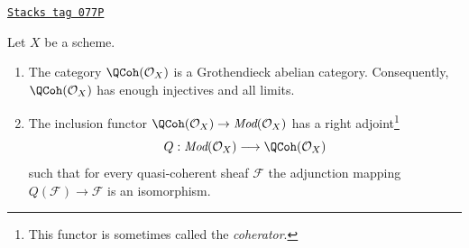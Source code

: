\begin{proposition}[Coherator]
\label{properties-proposition-coherator}
\href{https://stacks.math.columbia.edu/tag/077P}{\texttt{Stacks tag 077P}}

Let $X$ be a scheme.
\begin{enumerate}
\item The category $\QCoh(\mathcal{O}_X)$ is a Grothendieck
abelian category. Consequently, $\QCoh(\mathcal{O}_X)$
has enough injectives and all limits.
\item The inclusion functor
$\QCoh(\mathcal{O}_X) \to \textit{Mod}(\mathcal{O}_X)$
has a right adjoint\footnote{This functor is sometimes called
the {\it coherator}.}
$$
Q : \textit{Mod}(\mathcal{O}_X) \longrightarrow \QCoh(\mathcal{O}_X)
$$
such that for every quasi-coherent sheaf $\mathcal{F}$ the adjunction mapping
$Q(\mathcal{F}) \to \mathcal{F}$ is an isomorphism.
\end{enumerate}
\end{proposition}

